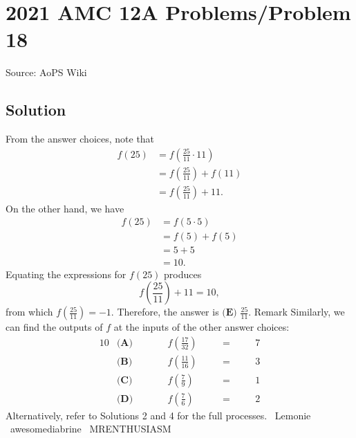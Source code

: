 \documentclass[12pt]{article}
\begin{document}
\section*{{2021 AMC 12A Problems/Problem 18}}
Source: AoPS Wiki

\subsection*{Solution}
From the answer choices, note that \begin{align*} f(25)&=f\left(\frac{25}{11}\cdot11\right) \\ &=f\left(\frac{25}{11}\right)+f(11) \\ &=f\left(\frac{25}{11}\right)+11. \end{align*} On the other hand, we have \begin{align*} f(25)&=f(5\cdot5) \\ &=f(5)+f(5) \\ &=5+5 \\ &=10. \end{align*} Equating the expressions for $f(25)$ produces \[f\left(\frac{25}{11}\right)+11=10,\] from which $f\left(\frac{25}{11}\right)=-1.$ Therefore, the answer is $\boxed{\textbf{(E) }\frac{25}{11}}.$ Remark Similarly, we can find the outputs of $f$ at the inputs of the other answer choices: \begin{alignat*}{10} &\textbf{(A)} \qquad && f\left(\frac{17}{32}\right) \quad && = \quad && 7 \\ &\textbf{(B)} \qquad && f\left(\frac{11}{16}\right) \quad && = \quad && 3 \\ &\textbf{(C)} \qquad && f\left(\frac{7}{9}\right) \quad && = \quad && 1 \\ &\textbf{(D)} \qquad && f\left(\frac{7}{6}\right) \quad && = \quad && 2 \end{alignat*} Alternatively, refer to Solutions 2 and 4 for the full processes. ~Lemonie ~awesomediabrine ~MRENTHUSIASM
\end{document}
